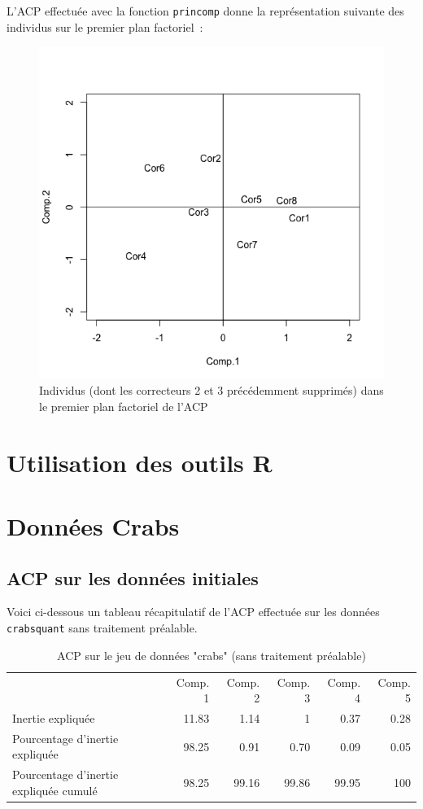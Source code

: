 \documentclass[a4paper,11pt]{report}
\begin{document}
L'ACP effectuée avec la fonction \texttt{princomp} donne la représentation suivante des individus sur le premier plan factoriel~:

\begin{figure}[H]
	\centering
	\captionsetup{justification=centering, margin=2cm}
	\includegraphics[width=.5\linewidth]{img/2-1-5-individus-with-na-premier-plan-factoriel}
	\caption{\scriptsize Individus (dont les correcteurs 2 et 3 précédemment supprimés) dans le premier plan factoriel de l'ACP}
	\label{fig:individus_with_na_premier_plan_factoriel}
\end{figure}


\section{Utilisation des outils R}



\section{Données Crabs}
\label{sec:2_3_ACP_Crabs}

\subsection{ACP sur les données initiales}

Voici ci-dessous un tableau récapitulatif de l'ACP effectuée sur les données \texttt{crabsquant} sans traitement préalable.

\begin{table}[H]
	\centering
	\captionsetup{justification=centering, margin=2cm}
	\caption{ACP sur le jeu de données "crabs" (sans traitement préalable)}
	\label{table:acp_crabs_initial_data}
	\begin{tabular}{lrrrrr}
		& Comp. 1 & Comp. 2 & Comp. 3 & Comp. 4 & Comp. 5 \\
		Inertie expliquée & 11.83 & 1.14 & 1 & 0.37 & 0.28 \\
		Pourcentage d'inertie expliquée & 98.25 & 0.91 & 0.70 & 0.09 & 0.05 \\
		Pourcentage d'inertie expliquée cumulé & 98.25 & 99.16 & 99.86 & 99.95 & 100
	\end{tabular}
\end{table}
\end{document}
